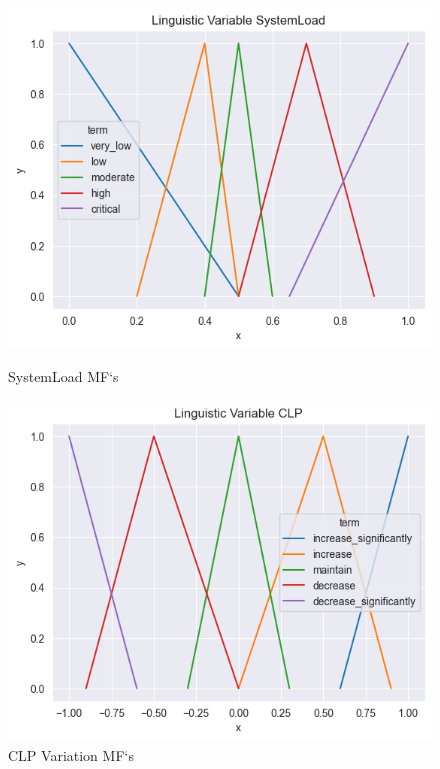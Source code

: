 \documentclass[titlepage]{article}
\begin{document}
\begin{figure}[H]
    \centering
    \begin{minipage}{0.45\textwidth}
        \centering
        \includegraphics[width=\textwidth]{../images/triangular_v4_SystemLoad}
        \caption{SystemLoad MF`s}
        \label{fig:systemload_triangular_v4}
    \end{minipage}
    \hfill
    \begin{minipage}{0.45\textwidth}
        \centering
        \includegraphics[width=\textwidth]{../images/triangular_v4_CLP}
        \caption{CLP Variation MF`s}
        \label{fig:clp_triangular_v4}
    \end{minipage}
\end{figure}
\end{document}
